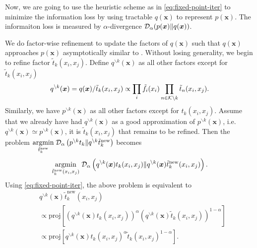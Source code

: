 \documentclass[conference]{IEEEtran}
\begin{document}
Now, we are going to use the heuristic scheme as in \autoref{eq:fixed-point-iter} to minimize the information loss by using tractable $q(\bm{x})$ to represent $p(\bm{x})$. The informaiton loss is measured by $\alpha$-divergence $\mathcal{D}_{\alpha}(p(\bm{x}) \| q(\bm{x}))$.

We do factor-wise refinement to update the factors of $q(\bm{x})$ such that $q(\bm{x})$ approaches $p(\bm{x})$ asymptotically similar to \cite{divergence-measures-and-message-passing,Minka:2001:EPA:647235.720257}. Without losing generality, we begin to refine factor $\tilde{t}_k(x_i, x_j)$. Define $q^{\backslash k}(\bm{x})$ as all other factors except for $\tilde{t}_k(x_i, x_j)$
\begin{equation}
  q^{\backslash k}(\bm{x}) = q(\bm{x})/\tilde{t}_k(x_i, x_j) \propto \prod_{{i}} \tilde{f}_i(x_i) \prod_{n\in \mathcal{K} \backslash k} \tilde{t}_n(x_i, x_j).
\end{equation}
Similarly, we have $p^{\backslash k}(\bm{x})$ as all other factors except for $t_k(x_i, x_j)$. Assume that we already have had $q^{\backslash k}(\bm{x})$ as a good approximation of $p^{\backslash k}(\bm{x})$, i.e. $q^{\backslash k}(\bm{x}) \simeq p^{\backslash k}(\bm{x})$, it is $\tilde{t}_k(x_i, x_j)$ that remains to be refined. 
Then the problem $\underset{\tilde{t}_k^{\text{new}}}{\operatorname{argmin}}\; \mathcal{D}_{\alpha}\left(  p^{\backslash k}t_k\|q^{\backslash k}\tilde{t}_k^{\text{new}}\right)$ becomes \vspace{-0.3cm}
\begin{equation}
  \underset{\tilde{t}_k^{\text{new}}(x_i, x_j)}{\operatorname{argmin}}\; \mathcal{D}_{\alpha}\left(  q^{\backslash k}(\bm{x}) t_k(x_i, x_j)\|q^{\backslash k}(\bm{x}) \tilde{t}_k^{\text{new}}(x_i, x_j) \right).
\end{equation}
Using \autoref{eq:fixed-point-iter}, the above problem is equivalent to
\begin{align}\label{eq:update-rule}
  &q^{\backslash k}(\bm{x}) \tilde{t}_k^{\text{new}}(x_i, x_j) \nonumber\\
  &\propto \text{proj}\left[ \left(q^{\backslash k}(\bm{x}) t_k(x_i, x_j)  \right)^{\alpha} \left(q^{\backslash k}(\bm{x}) \tilde{t}_k(x_i, x_j)  \right)^{1-\alpha} \right] \nonumber \\
  & \propto \text{proj}\left[ q^{\backslash k}(\bm{x}) t_k(x_i, x_j)^{\alpha} \tilde{t}_k(x_i, x_j)^{1-\alpha} \right].
\end{align}
\end{document}

